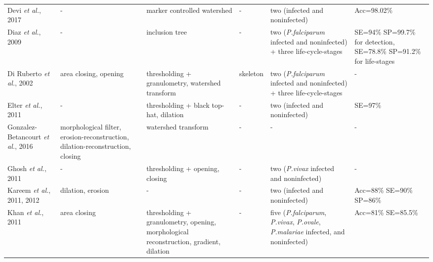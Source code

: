 \begin{longtable}{C{2.1cm} C{2.1cm} C{2.3cm} C{1.5cm} C{2.7cm} C{2.2cm} }
    Devi \emph{et al.}, 2017 &
		- &
		marker controlled watershed &	
		- &
		two (infected and noninfected)  &
		Acc=98.02\%
		\vspace{0.6cm}
        \\

    Diaz \emph{et al.}, 2009 &
		- &
		inclusion tree &	
		- &
		two (\emph{P.falciparum} infected and noninfected) + three life-cycle-stages &
		SE=94\% SP=99.7\% for detection, SE=78.8\% SP=91.2\% for life-stages
\vspace{0.6cm}
		\\

    Di Ruberto \emph{et al.}, 2002 &
		area closing, opening &
		thresholding + granulometry, watershed  transform &	
		skeleton &
		two (\emph{P.falciparum} infected and noninfected) + three life-cycle-stages &
		-
\vspace{0.6cm}
		\\

    Elter \emph{et al.}, 2011 &
		- &
		thresholding + black top-hat, dilation &	
		- &
		two (infected and noninfected) &
		SE=97\%
		\vspace{0.6cm} \\

    Gonzalez-Betancourt \emph{et al.}, 2016  &
    	morphological filter, erosion-reconstruction, dilation-reconstruction, closing &
    	watershed  transform  &
    	- &
    	- &
    	- \vspace{0.6cm} \\	

    Ghosh \emph{et al.}, 2011  &
    	- &
    	thresholding + opening, closing  &
    	- &
    	two (\emph{P.vivax} infected and noninfected) &
    	- \vspace{0.6cm} \\

    Kareem \emph{et al.}, 2011, 2012  &
    	dilation, erosion &
    	-  &
    	- &
    	two (infected and noninfected) &
    	Acc=88\% SE=90\% SP=86\% \vspace{0.6cm} \\	

    Khan \emph{et al.}, 2011  &
    	area closing &
    	thresholding + granulometry, opening, morphological reconstruction, gradient, dilation &
    	- &
    	five (\emph{P.falciparum}, \emph{P.vivax}, \emph{P.ovale}, \emph{P.malariae} infected, and noninfected) &
    	Acc=81\% SE=85.5\% \vspace{0.6cm} \\	


\end{longtable}
